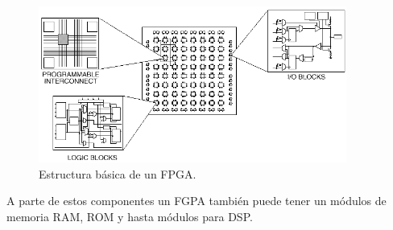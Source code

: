 \begin{figure}
	\centering
	\includegraphics[width=0.9\textwidth]{./images/figEstructuraFPGA}
	\caption{Estructura básica de un FPGA. \citep{figRandom1}}
	\label{figEstructuraFPGA}
\end{figure}

A parte de estos componentes un FGPA también puede tener un módulos de memoria RAM, ROM y hasta módulos para DSP.

